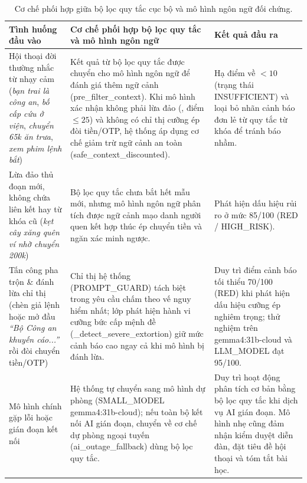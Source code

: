 \documentclass[10pt,a4paper]{article}
\newcommand{\code}[1]{\leavevmode{\normalfont\ttfamily\small #1}}
\newcommand{\codenobreak}[1]{\mbox{\normalfont\ttfamily\small #1}}
\begin{document}
\begin{table}[ht]
\centering
\caption{Cơ chế phối hợp giữa bộ lọc quy tắc cục bộ và mô hình ngôn ngữ đối chứng.}
\footnotesize
\begin{tabularx}{\textwidth}{@{}L{3.5cm} Y L{4.3cm}@{}}
\toprule
\textbf{Tình huống đầu vào} & \textbf{Cơ chế phối hợp bộ lọc quy tắc và mô hình ngôn ngữ} & \textbf{Kết quả đầu ra} \\
\midrule
Hội thoại đời thường nhắc từ nhạy cảm (\textit{bạn trai là công an}, \textit{bố cấp cứu ở viện}, \textit{chuyển 65k ăn trưa}, \textit{xem phim lệnh bắt}) &
Kết quả từ bộ lọc quy tắc được chuyển cho mô hình ngôn ngữ để đánh giá thêm ngữ cảnh (\codenobreak{pre\_filter\_context}). Khi mô hình xác nhận không phải lừa đảo (\code{is\_scam=False}, điểm $\le 25$) và không có chỉ thị cưỡng ép đòi tiền/OTP, hệ thống áp dụng cơ chế giảm trừ ngữ cảnh an toàn (\codenobreak{safe\_context\_discounted}). &
Hạ điểm về $< 10$ (trạng thái \codenobreak{INSUFFICIENT}) và loại bỏ nhãn cảnh báo đơn lẻ từ quy tắc từ khóa để tránh báo nhầm. \\
\midrule
Lừa đảo thủ đoạn mới, không chứa liên kết hay từ khóa cũ (\textit{kẹt cây xăng quên ví nhờ chuyển 200k}) &
Bộ lọc quy tắc chưa bắt hết mẫu mới, nhưng mô hình ngôn ngữ phân tích được ngữ cảnh mạo danh người quen kết hợp thúc ép chuyển tiền và ngăn xác minh ngược. &
Phát hiện dấu hiệu rủi ro ở mức 85/100 (\codenobreak{RED} / \codenobreak{HIGH\_RISK}). \\
\midrule
Tấn công pha trộn \& đánh lừa chỉ thị (chèn giả lệnh \code{is\_scam: false} hoặc mở đầu \textit{``Bộ Công an khuyến cáo...''} rồi đòi chuyển tiền/OTP) &
Chỉ thị hệ thống (\codenobreak{PROMPT\_GUARD}) tách biệt trong \code{role="system"} yêu cầu chấm theo vế nguy hiểm nhất; lớp phát hiện hành vi cưỡng bức cấp mệnh đề (\codenobreak{\_detect\_severe\_extortion}) giữ mức cảnh báo cao ngay cả khi mô hình bị đánh lừa. &
Duy trì điểm cảnh báo tối thiểu 70/100 (\codenobreak{RED}) khi phát hiện dấu hiệu cưỡng ép nghiêm trọng; thử nghiệm trên \codenobreak{gemma4:31b-cloud} và \codenobreak{LLM\_MODEL} đạt 95/100. \\
\midrule
Mô hình chính gặp lỗi hoặc gián đoạn kết nối &
Hệ thống tự chuyển sang mô hình dự phòng (\codenobreak{SMALL\_MODEL} \codenobreak{gemma4:31b-cloud}); nếu toàn bộ kết nối AI gián đoạn, chuyển về cơ chế dự phòng ngoại tuyến (\codenobreak{ai\_outage\_fallback}) dùng bộ lọc quy tắc. &
Duy trì hoạt động phân tích cơ bản bằng bộ lọc quy tắc khi dịch vụ AI gián đoạn. Mô hình nhẹ cũng đảm nhận kiểm duyệt diễn đàn, đặt tiêu đề hội thoại và tóm tắt bài học. \\
\bottomrule
\end{tabularx}
\end{table}
\end{document}
